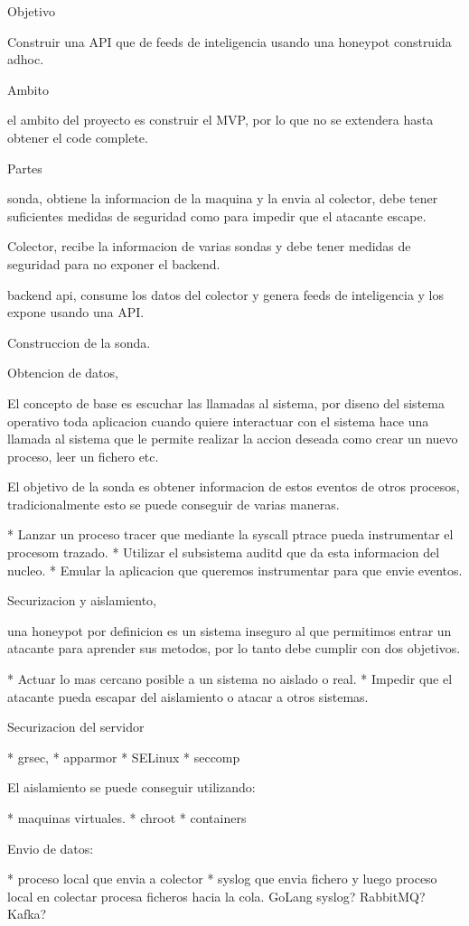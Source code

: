 Objetivo

Construir una API que de feeds de inteligencia usando una honeypot construida adhoc.

Ambito

el ambito del proyecto es construir el MVP, por lo que no se extendera hasta obtener el code complete.

Partes

sonda, obtiene la informacion de la maquina y la envia al colector, debe tener suficientes medidas
de seguridad como para impedir que el atacante escape.

Colector, recibe la informacion de varias sondas y debe tener medidas de seguridad para no exponer
el backend.

backend api, consume los datos del colector y genera feeds de inteligencia y los expone usando
una API.

Construccion de la sonda.

Obtencion de datos,

El concepto de base es escuchar las llamadas al sistema, por diseno del sistema operativo
toda aplicacion cuando quiere interactuar con el sistema hace una llamada al sistema que le
permite realizar la accion deseada como crear un nuevo proceso, leer un fichero etc.

El objetivo de la sonda es obtener informacion de estos eventos de otros procesos, tradicionalmente
esto se puede conseguir de varias maneras.

* Lanzar un proceso tracer que mediante la syscall ptrace pueda instrumentar el procesom trazado.
* Utilizar el subsistema auditd que da esta informacion del nucleo.
* Emular la aplicacion que queremos instrumentar para que envie eventos.


Securizacion y aislamiento,

una honeypot por definicion es un sistema inseguro al que permitimos entrar un atacante para
aprender sus metodos, por lo tanto debe cumplir con dos objetivos.

* Actuar lo mas cercano posible a un sistema no aislado o real.
* Impedir que el atacante pueda escapar del aislamiento o atacar a otros sistemas.

Securizacion del servidor

* grsec,
* apparmor
* SELinux
* seccomp

El aislamiento se puede conseguir utilizando:

* maquinas virtuales.
* chroot
* containers



Envio de datos:

* proceso local que envia a colector
* syslog que envia fichero y luego proceso local en colectar procesa ficheros hacia la cola.
  GoLang syslog? RabbitMQ? Kafka?
